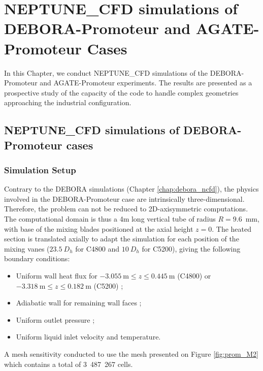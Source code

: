\chapter{NEPTUNE\_CFD simulations of DEBORA-Promoteur and AGATE-Promoteur Cases}
\label{chap:prom_ncfd}

\minitoc


In this Chapter, we conduct NEPTUNE\_CFD simulations of the DEBORA-Promoteur and AGATE-Promoteur experiments. The results are presented as a prospective study of the capacity of the code to handle complex geometries approaching the industrial configuration.


\section{NEPTUNE\_CFD simulations of DEBORA-Promoteur cases}
\label{sec:debprom_ncfd}

\subsection{Simulation Setup}

Contrary to the DEBORA simulations (Chapter \ref{chap:debora_ncfd}), the physics involved in the DEBORA-Promoteur case are intrinsically three-dimensional. Therefore, the problem can not be reduced to 2D-axisymmetric computations. The computational domain is thus a 4m long vertical tube of radius $R=9.6$\ mm, with base of the mixing blades positioned at the axial height $z=0$. The heated section is translated axially to adapt the simulation for each position of the mixing vanes ($23.5\ D_{h}$ for C4800 and $10\ D_{h}$ for C5200), giving the following boundary conditions:

\begin{itemize}
\item Uniform wall heat flux for $-3.055\ \textrm{m} \leq z \leq 0.445\ \textrm{m}$ (C4800) or $-3.318\ \textrm{m} \leq z \leq 0.182\ \textrm{m}$ (C5200) ;
\item Adiabatic wall for remaining wall faces ;
\item Uniform outlet pressure ;
\item Uniform liquid inlet velocity and temperature.
\end{itemize}


A mesh sensitivity conducted to use the mesh presented on Figure \ref{fig:prom_M2} which contains a total of 3~487~267 cells.


